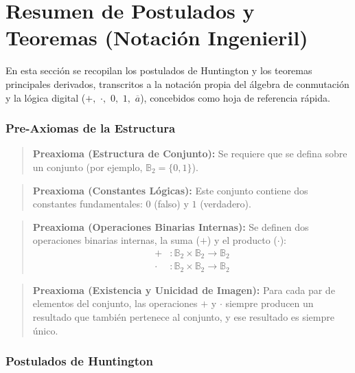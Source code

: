 \chapter{Resumen de Postulados y Teoremas (Notación Ingenieril)}
En esta sección se recopilan los postulados de Huntington y los teoremas principales derivados, transcritos a la notación propia del álgebra de conmutación y la lógica digital ($+,$ $\cdot,$ $0,$ $1,$ $\overline{a}$), concebidos como hoja de referencia rápida.

\subsection*{Pre-Axiomas de la Estructura}

\setcounter{tcb@cnt@preaxioma}{0}
\begin{quote}\textbf{Preaxioma (Estructura de Conjunto):}\label{esconj_eng}
Se requiere que se defina sobre un conjunto (por ejemplo, $\mathbb{B}_2 = \{0, 1\}$).
\end{quote}

\setcounter{tcb@cnt@preaxioma}{1}
\begin{quote}\textbf{Preaxioma (Constantes Lógicas):}\label{constantes_eng}
Este conjunto contiene dos constantes fundamentales: $0$ (falso) y $1$ (verdadero).
\end{quote}

\setcounter{tcb@cnt@preaxioma}{2}
\begin{quote}\textbf{Preaxioma (Operaciones Binarias Internas):}\label{opbinint_eng}
Se definen dos operaciones binarias internas, la suma ($+$) y el producto ($\cdot$):
\begin{align*}
+ &: \mathbb{B}_2 \times \mathbb{B}_2 \to \mathbb{B}_2 \\
\cdot &: \mathbb{B}_2 \times \mathbb{B}_2 \to \mathbb{B}_2
\end{align*}
\end{quote}

\setcounter{tcb@cnt@preaxioma}{4}
\begin{quote}\textbf{Preaxioma (Existencia y Unicidad de Imagen):}\label{exist_unic_eng}
Para cada par de elementos del conjunto, las operaciones $+$ y $\cdot$ siempre producen un resultado que también pertenece al conjunto, y ese resultado es siempre único.
\end{quote}

\subsection*{Postulados de Huntington}

